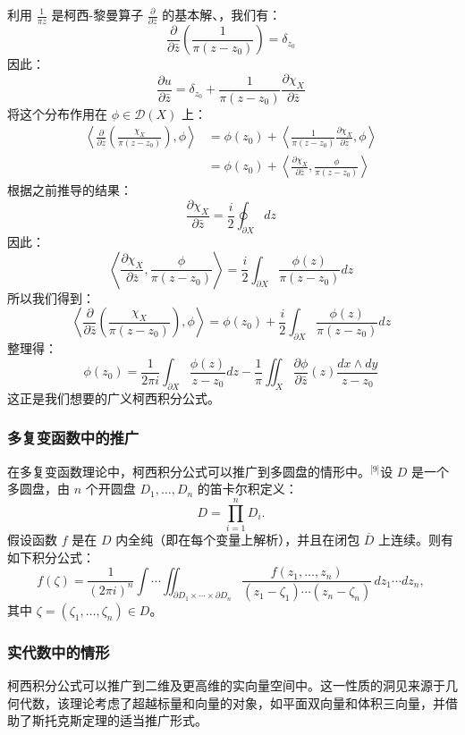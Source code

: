 利用 $\frac{1}{\pi z}$ 是柯西-黎曼算子 $\frac{\partial}{\partial \bar{z}}$ 的基本解、，我们有：
$$
\frac{\partial}{\partial \bar{z}}\left( \frac{1}{\pi(z - z_0)} \right) = \delta_{z_0}~
$$
因此：
$$
\frac{\partial u}{\partial \bar{z}} = \delta_{z_0} + \frac{1}{\pi(z - z_0)} \frac{\partial \chi_X}{\partial \bar{z}}~
$$
将这个分布作用在 $\phi \in \mathcal{D}(X)$ 上：
$$
\begin{aligned}
\left\langle \frac{\partial}{\partial \bar{z}}\left( \frac{\chi_X}{\pi(z - z_0)} \right), \phi \right\rangle 
&= \phi(z_0) + \left\langle \frac{1}{\pi(z - z_0)} \frac{\partial \chi_X}{\partial \bar{z}}, \phi \right\rangle\\
&= \phi(z_0) + \left\langle \frac{\partial \chi_X}{\partial \bar{z}}, \frac{\phi}{\pi(z - z_0)} \right\rangle
\end{aligned}~
$$
根据之前推导的结果：
$$
\frac{\partial \chi_X}{\partial \bar{z}} = \frac{i}{2} \oint_{\partial X} dz~
$$
因此：
$$
\left\langle \frac{\partial \chi_X}{\partial \bar{z}}, \frac{\phi}{\pi(z - z_0)} \right\rangle = \frac{i}{2} \int_{\partial X} \frac{\phi(z)}{\pi(z - z_0)} dz~
$$
所以我们得到：
$$
\left\langle \frac{\partial}{\partial \bar{z}}\left( \frac{\chi_X}{\pi(z - z_0)} \right), \phi \right\rangle = \phi(z_0) + \frac{i}{2} \int_{\partial X} \frac{\phi(z)}{\pi(z - z_0)} dz~
$$
整理得：
$$
\phi(z_0) = \frac{1}{2\pi i} \int_{\partial X} \frac{\phi(z)}{z - z_0} dz - \frac{1}{\pi} \iint_X \frac{\partial \phi}{\partial \bar{z}}(z) \frac{dx \wedge dy}{z - z_0}~
$$
这正是我们想要的广义柯西积分公式。
\subsubsection{多复变函数中的推广}
在多复变函数理论中，柯西积分公式可以推广到多圆盘的情形中。\(^\text{[9]}\)设 $D$ 是一个多圆盘，由 $n$ 个开圆盘 $D_1, \ldots, D_n$ 的笛卡尔积定义：
$$
D = \prod_{i=1}^n D_i.~
$$
假设函数 $f$ 是在 $D$ 内全纯（即在每个变量上解析），并且在闭包 $\overline{D}$ 上连续。则有如下积分公式：
$$
f(\zeta) = \frac{1}{(2\pi i)^n} \int\cdots\iint_{\partial D_1 \times \cdots \times \partial D_n} \frac{f(z_1, \ldots, z_n)}{(z_1 - \zeta_1)\cdots(z_n - \zeta_n)}\, dz_1 \cdots dz_n,~
$$
其中 $\zeta = (\zeta_1, \ldots, \zeta_n) \in D$。
\subsubsection{实代数中的情形}
柯西积分公式可以推广到二维及更高维的实向量空间中。这一性质的洞见来源于几何代数，该理论考虑了超越标量和向量的对象，如平面双向量和体积三向量，并借助了斯托克斯定理的适当推广形式。

